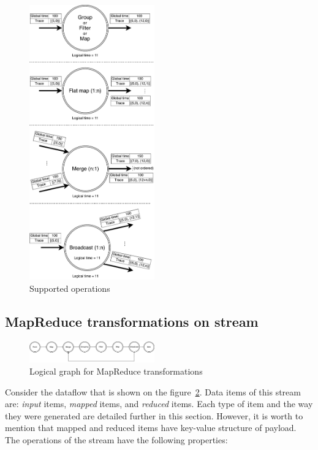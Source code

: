 \begin{figure}[htbp]
  \centering
  \includegraphics[width=0.48\textwidth]{pics/operations}
  \caption{Supported operations}
  \label {logical-graph-ops-figure}
\end{figure}

\subsection{MapReduce transformations on stream}

\begin{figure}[htbp]
  \centering
  \includegraphics[width=0.48\textwidth]{pics/mapreduce}
  \caption{Logical graph for MapReduce transformations}
  \label {logical-graph-figure}
\end{figure}

Consider the dataflow that is shown on the figure~\ref {logical-graph-figure}. Data items of this stream are: {\it input} items, {\it mapped} items, and {\it reduced} items. Each type of item and the way they were generated are detailed further in this section. However, it is worth to mention that mapped and reduced items have key-value structure of payload. The operations of the stream have the following properties:

